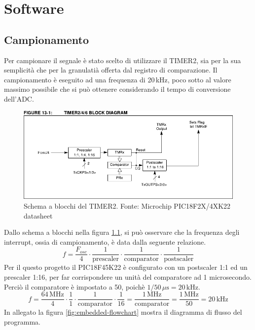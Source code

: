 \chapter{Software}
\section{Campionamento} \label{sec:sampling}
Per campionare il segnale \`e stato scelto di utilizzare il TIMER2, sia per la
sua semplicit\`a che per la granulati\`a offerta dal registro di comparazione.
Il campionamento \`e eseguito ad una frequenza di 20\,kHz, poco sotto al
valore massimo possibile che si pu\`o ottenere considerando il tempo di
conversione dell'ADC.

\begin{figure}[H] \centering
    \includegraphics[width=.9\linewidth]{figures/timer2-block-diagram}
    \caption[Schema a blocchi del TIMER2]{
        Schema a blocchi del TIMER2. Fonte: Microchip PIC18F2X/4XK22 datasheet
        \label{fig:timer2-diagram}
    }
\end{figure}

Dallo schema a blocchi nella figura \ref{fig:timer2-diagram}, si pu\`o
osservare che la frequenza degli interrupt, ossia di campionamento, \`e data
dalla seguente relazione.
\[
    f = \frac{F_{osc}}{4}\cdot
        \frac{1}{\textrm{prescaler}}\cdot
        \frac{1}{\textrm{comparator}}\cdot
        \frac{1}{\textrm{postscaler}}
\]
Per il questo progetto il PIC18F45K22 \`e configurato con un postscaler 1:1 ed
un prescaler 1:16, per far corrispondere un unit\`a del comparatore ad 1
microsecondo. Perci\`o il comparatore \`e impostato a 50, poich\`e
\(1/50\,\mu\textrm{s} = 20\,\textrm{kHz}\).
\[ 
    f = \frac{64\,\textrm{MHz}}{4}\cdot
        \frac{1}{1}\cdot
        \frac{1}{\textrm{comparator}}\cdot
        \frac{1}{16}
      = \frac{1\,\textrm{MHz}}{\textrm{comparator}} 
      = \frac{1\,\textrm{MHz}}{50} = 20\,\textrm{kHz}
\]
In allegato la figura \ref{fig:embedded-flowchart} mostra il diagramma di
flusso del programma.

